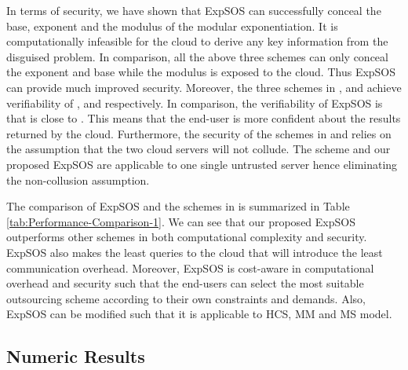 \documentclass[english,draftcls,onecolumn,11pt]{IEEEtran}
\theoremstyle{definition}
\theoremstyle{plain}
\theoremstyle{plain}
\theoremstyle{definition}
\begin{document}
In terms of security, we have shown that ExpSOS can successfully conceal
the base, exponent and the modulus of the modular exponentiation.
It is computationally infeasible for the cloud to derive any key information
from the disguised problem. In comparison, all the above three schemes
\cite{hohenberger2005securely,chen2012new,wang2014securely} can only
conceal the exponent and base while the modulus is exposed to the
cloud. Thus ExpSOS can provide much improved security. Moreover, the
three schemes in \cite{hohenberger2005securely},\cite{chen2012new}
and \cite{wang2014securely} achieve verifiability of ,
 and  respectively. In comparison, the
verifiability of ExpSOS is  that is close to
. This means that the end-user is more confident about the results
returned by the cloud. Furthermore, the security of the schemes in
\cite{hohenberger2005securely} and \cite{chen2012new} relies on
the assumption that the two cloud servers will not collude. The scheme
\cite{wang2014securely} and our proposed ExpSOS are applicable to
one single untrusted server hence eliminating the non-collusion assumption.

The comparison of ExpSOS and the schemes in \cite{hohenberger2005securely,chen2012new,wang2014securely}
is summarized in Table \ref{tab:Performance-Comparison-1}. We can
see that our proposed ExpSOS outperforms other schemes in both computational
complexity and security. ExpSOS also makes the least queries to the
cloud that will introduce the least communication overhead. Moreover,
ExpSOS is cost-aware in computational overhead and security such that
the end-users can select the most suitable outsourcing scheme according
to their own constraints and demands. Also, ExpSOS can be modified
such that it is applicable to HCS, MM and MS model.


\subsection{Numeric Results}
\end{document}
